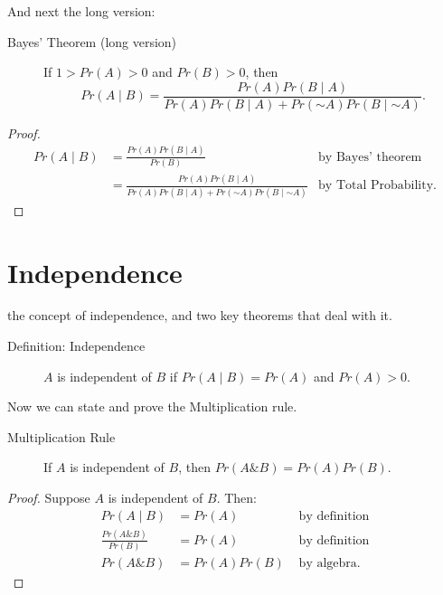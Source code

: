 \documentclass[justified]{tufte-book}
\newcommand{\given}{\mid}
\renewcommand{\neg}{\mathbin{\sim}}
\renewcommand{\wedge}{\mathbin{\&}}
\newcommand{\p}{Pr}
\theoremstyle{definition}
\theoremstyle{definition}
\theoremstyle{definition}
\theoremstyle{remark}
\let\BeginKnitrBlock\begin \let\EndKnitrBlock\end
\begin{document}
And next the long version:

\begin{description}
\item[Bayes' Theorem (long version)]
If \(1 > \p(A) > 0\) and \(\p(B)>0\), then
\[ \p(A \given B) = \frac{\p(A)\p(B \given A)}{\p(A)\p(B \given A) + \p(\neg A)\p(B \given \neg A)}. \]
\end{description}

\BeginKnitrBlock{proof}
{} \[
  \begin{aligned}
    \p(A \given B) 
      &= \frac{\p(A)\p(B \given A)}{\p(B)} & \mbox{by Bayes' theorem}\\
      &= \frac{\p(A)\p(B \given A)}{\p(A)\p(B \given A) + \p(\neg A)\p(B \given \neg A)} & \mbox{by Total Probability.}
  \end{aligned}
\]
\EndKnitrBlock{proof}

\hypertarget{independence-1}{%
\section*{Independence}\label{independence-1}}

 the concept of independence, and
two key theorems that deal with it.

\begin{description}
\item[Definition: Independence]
\(A\) is independent of \(B\) if \(\p(A \given B) = \p(A)\) and
\(\p(A) > 0\).
\end{description}

Now we can state and prove the Multiplication rule.

\begin{description}
\item[Multiplication Rule]
If \(A\) is independent of \(B\), then \(\p(A \wedge B) = \p(A)\p(B)\).
\end{description}

\BeginKnitrBlock{proof}
{} Suppose \(A\) is independent of \(B\). Then:
\[
  \begin{aligned}
    \p(A \given B) &= \p(A)                &  \mbox{ by definition}\\
    \frac{\p(A \wedge B)}{\p(B)} &= \p(A)  &  \mbox{ by definition}\\
    \p(A \wedge B) &= \p(A) \p(B)          &  \mbox{ by algebra.}
\end{aligned}
\]
\EndKnitrBlock{proof}
\end{document}
